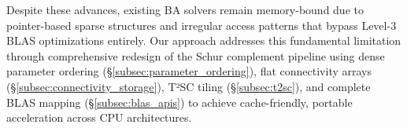 Despite these advances, existing BA solvers remain memory-bound due to pointer-based sparse structures and irregular access 
patterns that bypass Level-3 BLAS optimizations entirely. Our approach addresses this fundamental limitation through 
comprehensive redesign of the Schur complement pipeline using dense parameter ordering 
(\S\ref{subsec:parameter_ordering}), flat connectivity arrays (\S\ref{subsec:connectivity_storage}), T²SC tiling 
(\S\ref{subsec:t2sc}), and complete BLAS mapping (\S\ref{subsec:blas_apis}) to achieve cache-friendly, portable acceleration 
across CPU architectures.




